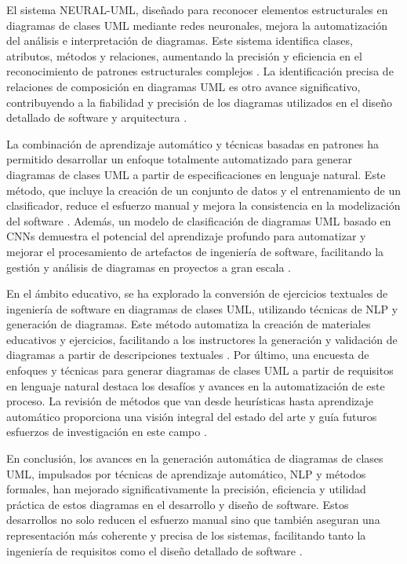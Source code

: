 El sistema NEURAL-UML, diseñado para reconocer elementos estructurales en diagramas de clases UML mediante redes neuronales, mejora la automatización del análisis e interpretación de diagramas. Este sistema identifica clases, atributos, métodos y relaciones, aumentando la precisión y eficiencia en el reconocimiento de patrones estructurales complejos \cite{Chu2020}. La identificación precisa de relaciones de composición en diagramas UML es otro avance significativo, contribuyendo a la fiabilidad y precisión de los diagramas utilizados en el diseño detallado de software y arquitectura \cite{Koenig2023}.

La combinación de aprendizaje automático y técnicas basadas en patrones ha permitido desarrollar un enfoque totalmente automatizado para generar diagramas de clases UML a partir de especificaciones en lenguaje natural. Este método, que incluye la creación de un conjunto de datos y el entrenamiento de un clasificador, reduce el esfuerzo manual y mejora la consistencia en la modelización del software \cite{Milanova2005}. Además, un modelo de clasificación de diagramas UML basado en CNNs demuestra el potencial del aprendizaje profundo para automatizar y mejorar el procesamiento de artefactos de ingeniería de software, facilitando la gestión y análisis de diagramas en proyectos a gran escala \cite{Yang2022}.

En el ámbito educativo, se ha explorado la conversión de ejercicios textuales de ingeniería de software en diagramas de clases UML, utilizando técnicas de NLP y generación de diagramas. Este método automatiza la creación de materiales educativos y ejercicios, facilitando a los instructores la generación y validación de diagramas a partir de descripciones textuales \cite{Wang2022}. Por último, una encuesta de enfoques y técnicas para generar diagramas de clases UML a partir de requisitos en lenguaje natural destaca los desafíos y avances en la automatización de este proceso. La revisión de métodos que van desde heurísticas hasta aprendizaje automático proporciona una visión integral del estado del arte y guía futuros esfuerzos de investigación en este campo \cite{Huber2022}.

En conclusión, los avances en la generación automática de diagramas de clases UML, impulsados por técnicas de aprendizaje automático, NLP y métodos formales, han mejorado significativamente la precisión, eficiencia y utilidad práctica de estos diagramas en el desarrollo y diseño de software. Estos desarrollos no solo reducen el esfuerzo manual sino que también aseguran una representación más coherente y precisa de los sistemas, facilitando tanto la ingeniería de requisitos como el diseño detallado de software \cite{Abdelnabi2021}.

